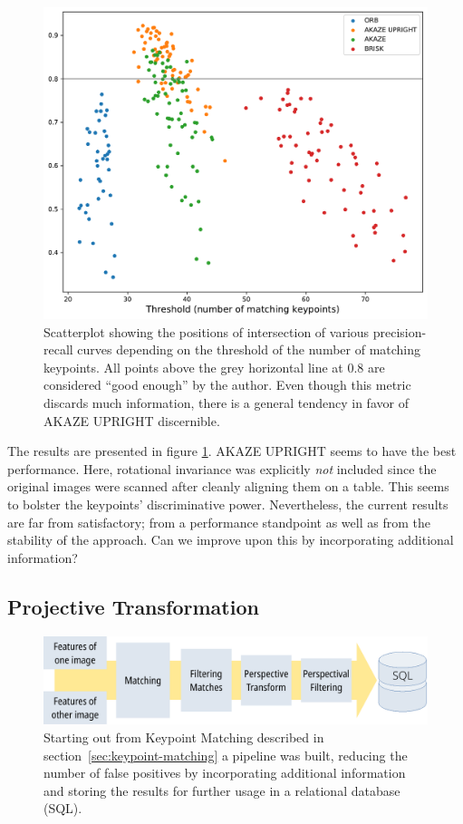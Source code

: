 \documentclass{ltjarticle}
\begin{document}
\begin{figure}
    \centering
    \includegraphics[width=\textwidth]{keypoint-evaluation.pdf}
    \caption{Scatterplot showing the positions of intersection of various precision-recall curves depending on the threshold of the number of matching keypoints. All points above the grey horizontal line at $0.8$ are considered “good enough” by the author. Even though this metric discards much information, there is a general tendency in favor of AKAZE UPRIGHT discernible.}
    \label{fig:keypoint-evaluation}
\end{figure}

The results are presented in figure \ref{fig:keypoint-evaluation}. AKAZE UPRIGHT seems to have the best performance. Here, rotational invariance was explicitly \emph{not} included since the original images were scanned after cleanly aligning them on a table. This seems to bolster the keypoints' discriminative power. Nevertheless, the current results are far from satisfactory; from a performance standpoint as well as from the stability of the approach. Can we improve upon this by incorporating additional information?

\subsection{Projective Transformation}

\begin{figure}
    \centering
    \includegraphics[width=\textwidth]{pipeline.pdf}
    \caption{Starting out from Keypoint Matching described in section~\ref{sec:keypoint-matching} a pipeline was built, reducing the number of false positives by incorporating additional information and storing the results for further usage in a relational database (SQL).}
    \label{fig:pipeline}
\end{figure}
\end{document}
